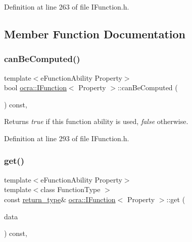 Definition at line 263 of file I\+Function.\+h.



\subsection{Member Function Documentation}
\hypertarget{classocra_1_1IFunction_a18703c0b7573f9a1629236c9e10150d9}{}\label{classocra_1_1IFunction_a18703c0b7573f9a1629236c9e10150d9} 
\subsubsection{\texorpdfstring{can\+Be\+Computed()}{canBeComputed()}}
{\footnotesize\ttfamily template$<$e\+Function\+Ability Property$>$ \\
bool \hyperlink{classocra_1_1IFunction}{ocra\+::\+I\+Function}$<$ Property $>$\+::can\+Be\+Computed (\begin{DoxyParamCaption}{ }\end{DoxyParamCaption}) const\hspace{0.3cm}{\ttfamily [inline]}, {\ttfamily [protected]}}

\begin{DoxyReturn}{Returns}
{\itshape true} if this function ability is used, {\itshape false} otherwise. 
\end{DoxyReturn}


Definition at line 293 of file I\+Function.\+h.

\hypertarget{classocra_1_1IFunction_a0f7422af163eedba66749b79b9a70787}{}\label{classocra_1_1IFunction_a0f7422af163eedba66749b79b9a70787} 
\subsubsection{\texorpdfstring{get()}{get()}\hspace{0.1cm}{\footnotesize\ttfamily [1/2]}}
{\footnotesize\ttfamily template$<$e\+Function\+Ability Property$>$ \\
template$<$class Function\+Type $>$ \\
const \hyperlink{classocra_1_1IFunction_a04d351c2f938d01046328b54fb7e6525}{return\+\_\+type}\& \hyperlink{classocra_1_1IFunction}{ocra\+::\+I\+Function}$<$ Property $>$\+::get (\begin{DoxyParamCaption}\item[{Function\+Type \&}]{data }\end{DoxyParamCaption}) const\hspace{0.3cm}{\ttfamily [inline]}, {\ttfamily [protected]}}

